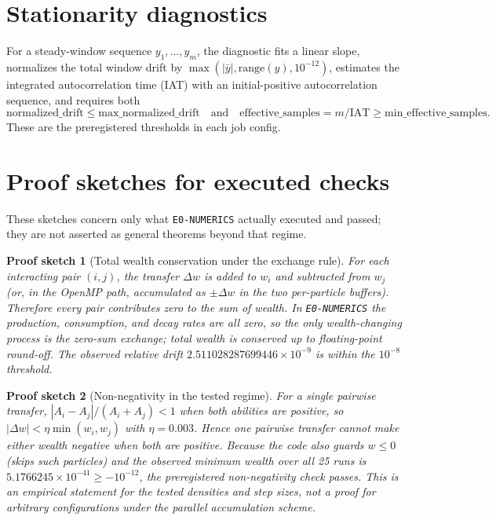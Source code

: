 \documentclass[11pt,a4paper]{article}
\newtheorem{sketch}{Proof sketch}
\newcommand{\code}[1]{\texttt{#1}}
\begin{document}
\section{Stationarity diagnostics}
\label{sec:stationarity}

For a steady-window sequence $y_1,\dots,y_m$, the diagnostic fits a linear
slope, normalizes the total window drift by $\max(|\bar y|,\mathrm{range}(y),10^{-12})$,
estimates the integrated autocorrelation time (IAT) with an initial-positive
autocorrelation sequence, and requires both
\begin{equation}
\mathrm{normalized\_drift} \le \mathrm{max\_normalized\_drift}
\quad\text{and}\quad
\mathrm{effective\_samples} = m/\mathrm{IAT} \ge \mathrm{min\_effective\_samples}.
\end{equation}
These are the preregistered thresholds in each job config.

\section{Proof sketches for executed checks}
\label{sec:proofs}

These sketches concern only what \code{E0-NUMERICS} actually executed and
passed; they are not asserted as general theorems beyond that regime.

\begin{sketch}[Total wealth conservation under the exchange rule]
For each interacting pair $(i,j)$, the transfer $\Delta w$ is added to $w_i$ and
subtracted from $w_j$ (or, in the OpenMP path, accumulated as $\pm\Delta w$ in
the two per-particle buffers). Therefore every pair contributes zero to the
sum of wealth. In \code{E0-NUMERICS} the production, consumption, and decay
rates are all zero, so the only wealth-changing process is the zero-sum
exchange; total wealth is conserved up to floating-point round-off. The
observed relative drift $2.511028287699446\times10^{-9}$ is within the
$10^{-8}$ threshold.
\end{sketch}

\begin{sketch}[Non-negativity in the tested regime]
For a single pairwise transfer, $|A_i-A_j|/(A_i+A_j)<1$ when both abilities
are positive, so $|\Delta w| < \eta\min(w_i,w_j)$ with $\eta=0.003$. Hence one
pairwise transfer cannot make either wealth negative when both are positive.
Because the code also guards $w\le0$ (skips such particles) and the observed
minimum wealth over all 25 runs is $5.1766245\times10^{-41}\ge -10^{-12}$, the
preregistered non-negativity check passes. This is an empirical statement for
the tested densities and step sizes, not a proof for arbitrary configurations
under the parallel accumulation scheme.
\end{sketch}
\end{document}
